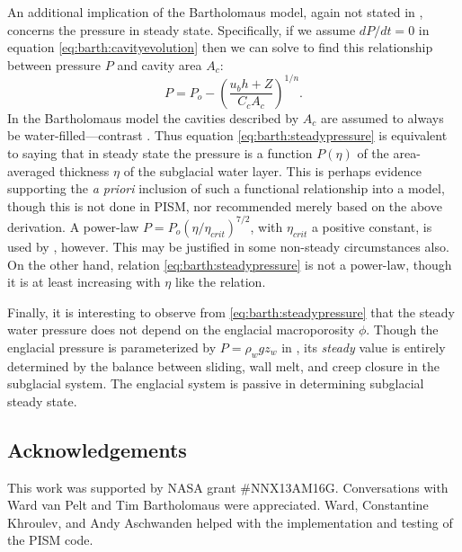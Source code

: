 \documentclass[review,letterpaper]{igs}
\begin{document}
An additional implication of the Bartholomaus model, again not stated in \cite{Bartholomausetal2011}, concerns the pressure in steady state.  Specifically, if we assume $dP/dt=0$ in equation \eqref{eq:barth:cavityevolution} then we can solve to find this relationship between pressure $P$ and cavity area $A_c$:
\begin{equation}
P = P_o - \left(\frac{u_b h + Z}{C_c A_c}\right)^{1/n}. \label{eq:barth:steadypressure}
\end{equation}
In the Bartholomaus model the cavities described by $A_c$ are assumed to always be water-filled---contrast \citep{Schoofetal2012}.  Thus equation \eqref{eq:barth:steadypressure} is equivalent to saying that in steady state the pressure is a function $P(\eta)$ of the area-averaged thickness $\eta$ of the subglacial water layer.  This is perhaps evidence supporting the \emph{a priori} inclusion of such a functional relationship into a model, though this is not done in PISM, nor recommended merely based on the above derivation.  A power-law $P = P_o (\eta/\eta_{crit})^{7/2}$, with $\eta_{crit}$ a positive constant, is used by \cite{FlowersClarke2002_theory}, however.  This may be justified in some non-steady circumstances also.  On the other hand, relation \eqref{eq:barth:steadypressure} is not a power-law, though it is at least increasing with $\eta$ like the \cite{FlowersClarke2002_theory} relation.

Finally, it is interesting to observe from \eqref{eq:barth:steadypressure} that the steady water pressure does not depend on the englacial macroporosity $\phi$.  Though the englacial pressure is parameterized by $P=\rho_w g z_w$ in \cite{Bartholomausetal2011}, its \emph{steady} value is entirely determined by the balance between sliding, wall melt, and creep closure in the subglacial system.  The englacial system is passive in determining subglacial steady state.


\subsection*{Acknowledgements}  This work was supported by NASA grant \#NNX13AM16G.  Conversations with Ward van Pelt and Tim Bartholomaus were appreciated.  Ward, Constantine Khroulev, and Andy Aschwanden helped with the implementation and testing of the PISM code.



\end{document}
